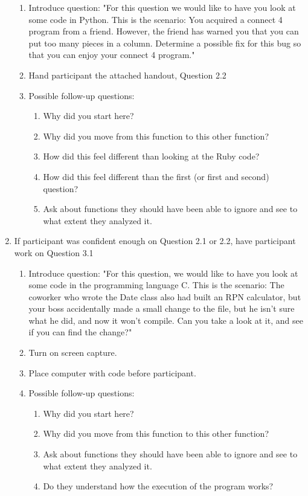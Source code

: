 \documentclass{article}
\begin{document}
\begin{enumerate}
   \begin{enumerate}
    \item Introduce question: "For this question we would like to have you look at some code in Python. This is the scenario: You acquired a connect 4 program from a friend. However, the friend has warned you that you can put too many pieces in a column. Determine a possible fix for this bug so that you can enjoy your connect 4 program."
    \item Hand participant the attached handout, Question 2.2
    \item Possible follow-up questions:
    \begin{enumerate}
      \item Why did you start here?
      \item Why did you move from this function to this other function?
      \item How did this feel different than looking at the Ruby code?
      \item How did this feel different than the first (or first and second) question?
      \item Ask about functions they should have been able to ignore and see to what extent they analyzed it.
    \end{enumerate}
  \end{enumerate}
  \item If participant was confident enough on Question 2.1 or 2.2, have participant work on Question 3.1
   \begin{enumerate}
    \item Introduce question: "For this question, we would like to have you look at some code in the programming language C. This is the scenario: The coworker who wrote the Date class also had built an RPN calculator, but your boss accidentally made a small change to the file, but he isn't sure what he did, and now it won't compile.  Can you take a look at it, and see if you can find the change?" 
    \item Turn on screen capture.
    \item Place computer with code before participant.
    \item Possible follow-up questions:
     \begin{enumerate}
      \item Why did you start here?
      \item Why did you move from this function to this other function?
      \item Ask about functions they should have been able to ignore and see to what extent they analyzed it.
      \item Do they understand how the execution of the program works?
    \end{enumerate}
  \end{enumerate}
  
\end{enumerate}
\end{document}
